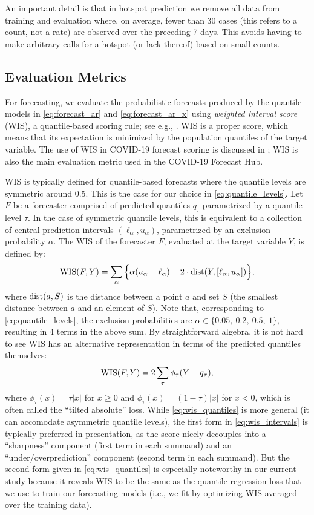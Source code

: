 \documentclass[9pt,twocolumn,twoside,lineno]{pnas-new}
\begin{document}
An important detail is that in hotspot prediction we remove all data from
training and evaluation where, on average, fewer than 30 cases (this refers to a
count, not a rate) are observed over the preceding 7 days. This avoids having to
make arbitrary calls for a hotspot (or lack thereof) based on small counts.   

\subsection{Evaluation Metrics}

For forecasting, we evaluate the probabilistic forecasts produced by the
quantile models in \eqref{eq:forecast_ar} and \eqref{eq:forecast_ar_x} using 
\textit{weighted interval score} (WIS), a quantile-based scoring rule; see e.g.,
\cite{Gneiting:2007}.  WIS is a proper score, which means that its expectation 
is minimized by the population quantiles of the target variable.  The use of WIS
in COVID-19 forecast scoring is discussed in \cite{Bracher:2021}; WIS is also
the main evaluation metric used in the COVID-19 Forecast Hub.

WIS is typically defined for quantile-based forecasts where the quantile levels
are symmetric around 0.5.  This is the case for our choice in
\eqref{eq:quantile_levels}.  Let $F$ be a forecaster comprised of predicted
quantiles $q_\tau$ parametrized by a quantile level $\tau$.  In the case of
symmetric quantile levels, this is equivalent to a collection of central
prediction intervals $(\ell_\alpha, u_\alpha)$, parametrized by an exclusion
probability $\alpha$. The WIS of the forecaster $F$, evaluated at the target
variable $Y$, is defined by:
\begin{equation}
\label{eq:wis_intervals}
\mathrm{WIS}(F,Y) = \sum_\alpha \Big\{\alpha(u_\alpha - \ell_\alpha) + 2 \cdot
\mathrm{dist}(Y, [\ell_\alpha, u_\alpha])\Big\},  
\end{equation}
where $\mathrm{dist}(a, S)$ is the distance between a point $a$ and set $S$ (the
smallest distance between $a$ and an element of $S$).  Note that, corresponding  
to \eqref{eq:quantile_levels}, the exclusion probabilities are $\alpha \in
\{0.05,\ 0.2,\ 0.5,\ 1\}$, resulting in 4 terms in the above sum.  By 
straightforward algebra, it is not hard to see WIS has an alternative 
representation in terms of the predicted quantiles themselves:
\begin{equation}
\label{eq:wis_quantiles}
\mathrm{WIS}(F,Y) = 2 \sum_\tau \phi_\tau(Y - q_\tau), 
\end{equation}
where $\phi_\tau(x) = \tau |x|$ for $x \geq 0$ and $\phi_\tau(x) = (1-\tau)
|x|$ for $x<0$, which is often called the ``tilted absolute'' loss.  While
\eqref{eq:wis_quantiles} is more general (it can accomodate asymmetric quantile
levels), the first form in \eqref{eq:wis_intervals} is typically preferred in
presentation, as the score nicely decouples into a ``sharpness'' component
(first term in each summand) and an ``under/overprediction'' component (second
term in each summand).  But the second form given in \eqref{eq:wis_quantiles} is 
especially noteworthy in our current study because it reveals WIS to be the same
as the quantile regression loss that we use to train our forecasting models
(i.e., we fit by optimizing WIS averaged over the training data).
\end{document}
